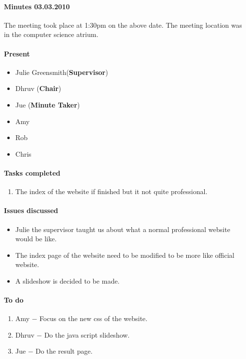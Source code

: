 \paragraph{Minutes 03.03.2010}  
The meeting took place at 1:30pm on the above date. The meeting location was in the computer science atrium. 

\paragraph{Present}

\begin{itemize}
	\item Julie Greensmith(\textbf{Supervisor})
	\item Dhruv (\textbf{Chair})
	\item Jue (\textbf{Minute Taker})
	\item Amy
	\item Rob
	\item Chris
	
\end{itemize}

\paragraph{Tasks completed}

\begin{enumerate}
	\item The index of the website if finished but it not quite professional.
\end{enumerate}

\paragraph{Issues discussed}

\begin{itemize}
	\item Julie the supervisor taught us about what a normal professional website would be like.
	\item The index page of the website need to be modified to be more like official website.
	\item A slideshow is decided to be made.
	
\end{itemize}

\paragraph{To do}

\begin{enumerate}
	\item Amy $-$ Focus on the new css of the website.
	\item Dhruv $-$ Do the java script slideshow.
	\item Jue $-$ Do the result page.
\end{enumerate}
